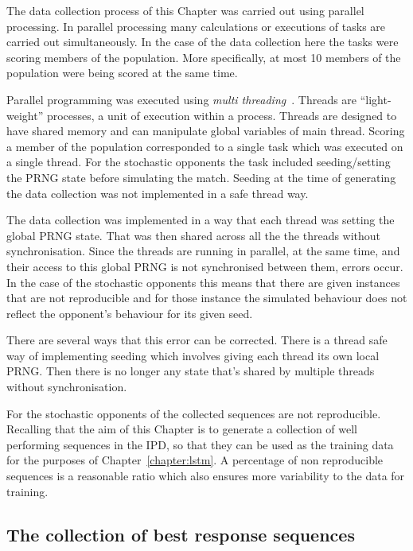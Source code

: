 The data collection process of this Chapter was carried out using parallel
processing. In parallel processing many calculations or executions of tasks
are carried out simultaneously. In the case of the data collection here the
tasks were scoring members of the population. More specifically, at most 10
members of the population were being scored at the same time.

Parallel programming was executed using \textit{multi
threading}~\cite{Shameem2005}. Threads are “light-weight” processes, a unit of
execution within a process. Threads are designed to have shared memory and can
manipulate global variables of main thread. Scoring a member of the population
corresponded to a single task which was executed on a single thread. For the
stochastic opponents the task included seeding/setting the PRNG state before
simulating the match. Seeding at the time of generating the data
collection was not implemented in a safe thread way.

The data collection was implemented in a way that each thread was setting the
global PRNG state. That was then shared across all the the threads without
synchronisation. Since the threads are running in parallel, at the same time,
and their access to this global PRNG is not synchronised between them, errors
occur. In the case of the stochastic opponents this means that there are given
instances that are not reproducible and for those instance the simulated behaviour
does not reflect the opponent's behaviour for its given seed.

There are several ways that this error can be corrected. There is a thread safe
way of implementing seeding which involves giving each thread its own local
PRNG. Then there is no longer any state that's shared by multiple threads
without synchronisation.

For the stochastic opponents \nonreproducible of the collected sequences are not
reproducible. Recalling that the aim of this Chapter is to generate a collection of well
performing sequences in the IPD, so that they can be used as the training data for the
purposes of Chapter~\ref{chapter:lstm}. A \nonreproducible percentage of non
reproducible sequences is a reasonable ratio which also ensures more variability
to the data for training.

\subsection{The collection of best response sequences}\label{section:the_collection_of_best_response_sequences}

